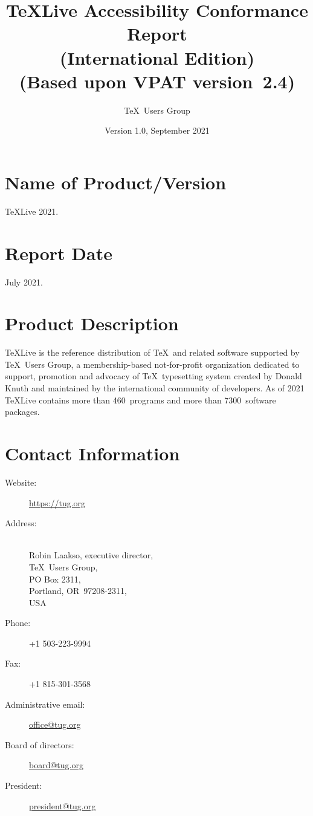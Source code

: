 \documentclass{report}
\begin{document}
\title{\TeX Live Accessibility Conformance Report\\
  (International Edition)\\
(Based upon VPAT\textsuperscript{\textregistered} version~2.4)}
\author{\TeX\ Users Group}
\date{Version 1.0, September 2021}
\maketitle

\clearpage

\tableofcontents

\clearpage

\section{Name of Product/Version}
\label{sec:name}

\TeX Live 2021.


\section{Report Date}
\label{sec:date}

July 2021.


\section{Product Description}
\label{sec:description}

\TeX Live is the reference distribution of \TeX\ and related software
supported by \TeX\ Users Group, a membership-based not-for-profit
organization dedicated to support, promotion and advocacy of \TeX\
typesetting system created by Donald Knuth and maintained by the
international community of developers.  As of 2021 \TeX Live contains
more than 460~programs and more than 7300~software packages.

\section{Contact Information}
\label{sec:contact_info}

  \begin{description}
  \item[Website:]  \url{https://tug.org}
  \item[Address:] \leavevmode\\
    Robin Laakso, executive director,\\
    \TeX\ Users Group,\\
    PO Box 2311,\\
    Portland, OR~97208-2311,\\
    USA
  \item[Phone:] +1 503-223-9994
  \item[Fax:] +1 815-301-3568
  \item[Administrative email:] \href{mailto:office@tug.org}{office@tug.org}
  \item[Board of directors:] \href{mailto:board@tug.org}{board@tug.org}
  \item[President:] \href{mailto:president@tug.org}{president@tug.org}
  \end{description}
\end{document}
